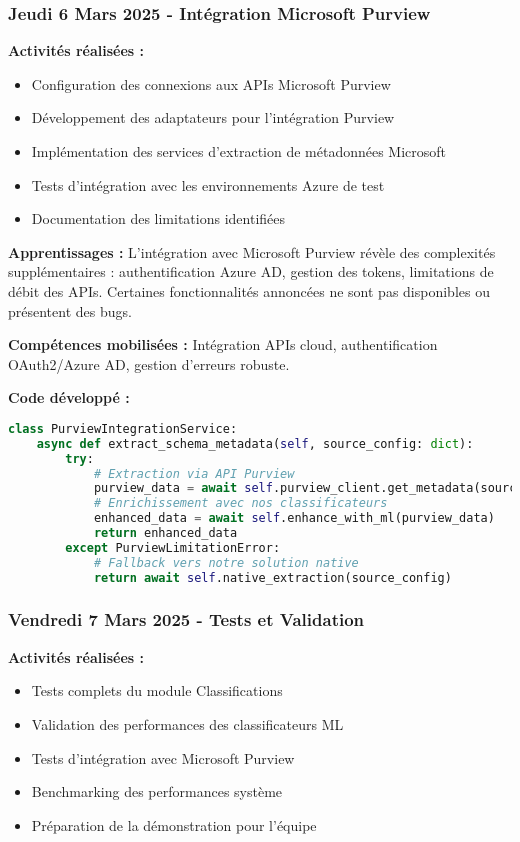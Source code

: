 \subsubsection{Jeudi 6 Mars 2025 - Intégration Microsoft Purview}

\textbf{Activités réalisées :}
\begin{itemize}
    \item Configuration des connexions aux APIs Microsoft Purview
    \item Développement des adaptateurs pour l'intégration Purview
    \item Implémentation des services d'extraction de métadonnées Microsoft
    \item Tests d'intégration avec les environnements Azure de test
    \item Documentation des limitations identifiées
\end{itemize}

\textbf{Apprentissages :}
L'intégration avec Microsoft Purview révèle des complexités supplémentaires : authentification Azure AD, gestion des tokens, limitations de débit des APIs. Certaines fonctionnalités annoncées ne sont pas disponibles ou présentent des bugs.

\textbf{Compétences mobilisées :}
Intégration APIs cloud, authentification OAuth2/Azure AD, gestion d'erreurs robuste.

\textbf{Code développé :}
\begin{lstlisting}[language=Python, caption=Intégration Microsoft Purview]
class PurviewIntegrationService:
    async def extract_schema_metadata(self, source_config: dict):
        try:
            # Extraction via API Purview
            purview_data = await self.purview_client.get_metadata(source_config)
            # Enrichissement avec nos classificateurs
            enhanced_data = await self.enhance_with_ml(purview_data)
            return enhanced_data
        except PurviewLimitationError:
            # Fallback vers notre solution native
            return await self.native_extraction(source_config)
\end{lstlisting}

\subsubsection{Vendredi 7 Mars 2025 - Tests et Validation}

\textbf{Activités réalisées :}
\begin{itemize}
    \item Tests complets du module Classifications
    \item Validation des performances des classificateurs ML
    \item Tests d'intégration avec Microsoft Purview
    \item Benchmarking des performances système
    \item Préparation de la démonstration pour l'équipe
\end{itemize}


